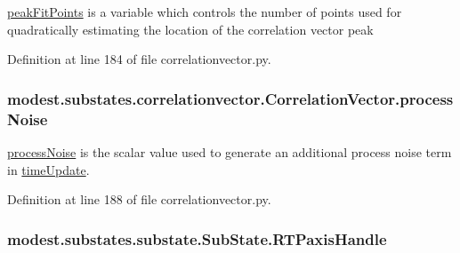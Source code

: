\hyperlink{classmodest_1_1substates_1_1correlationvector_1_1CorrelationVector_af2be8d7129fd0453208af5268fdddc22}{peak\+Fit\+Points} is a variable which controls the number of points used for quadratically estimating the location of the correlation vector peak 



Definition at line 184 of file correlationvector.\+py.

\subsubsection[{\texorpdfstring{process\+Noise}{processNoise}}]{\setlength{\rightskip}{0pt plus 5cm}modest.\+substates.\+correlationvector.\+Correlation\+Vector.\+process\+Noise}\hypertarget{classmodest_1_1substates_1_1correlationvector_1_1CorrelationVector_ab1756128cdec161ea22557d756745195}{}\label{classmodest_1_1substates_1_1correlationvector_1_1CorrelationVector_ab1756128cdec161ea22557d756745195}


\hyperlink{classmodest_1_1substates_1_1correlationvector_1_1CorrelationVector_ab1756128cdec161ea22557d756745195}{process\+Noise} is the scalar value used to generate an additional process noise term in \hyperlink{classmodest_1_1substates_1_1correlationvector_1_1CorrelationVector_a59c13e5fa26ba27717494f687ec78ef8}{time\+Update}. 



Definition at line 188 of file correlationvector.\+py.

\subsubsection[{\texorpdfstring{R\+T\+Paxis\+Handle}{RTPaxisHandle}}]{\setlength{\rightskip}{0pt plus 5cm}modest.\+substates.\+substate.\+Sub\+State.\+R\+T\+Paxis\+Handle\hspace{0.3cm}{\ttfamily [inherited]}}\hypertarget{classmodest_1_1substates_1_1substate_1_1SubState_a497ccbb6658589b02568e87c6382222e}{}\label{classmodest_1_1substates_1_1substate_1_1SubState_a497ccbb6658589b02568e87c6382222e}


